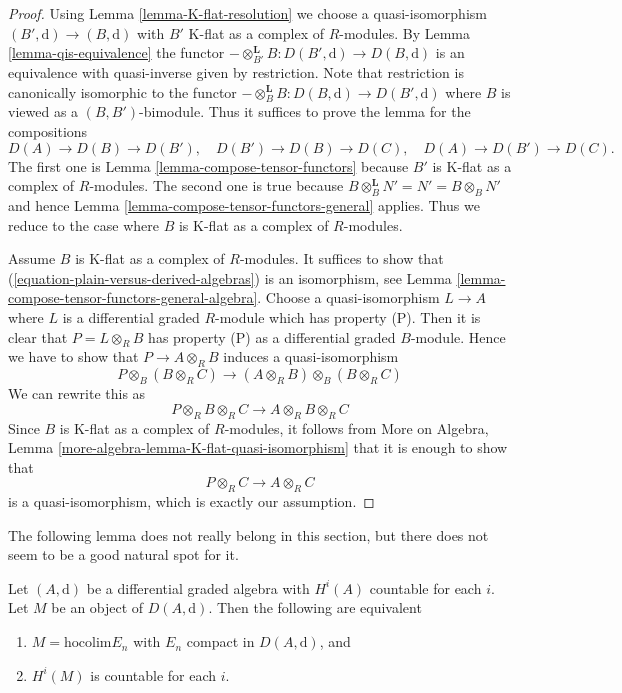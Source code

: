 \begin{proof}
Using Lemma \ref{lemma-K-flat-resolution}
we choose a quasi-isomorphism $(B', \text{d}) \to (B, \text{d})$
with $B'$ K-flat as a complex of $R$-modules.
By Lemma \ref{lemma-qis-equivalence}
the functor $-\otimes^\mathbf{L}_{B'} B : D(B', \text{d}) \to D(B, \text{d})$
is an equivalence with quasi-inverse given by restriction.
Note that restriction is canonically isomorphic to the functor
$- \otimes^\mathbf{L}_B B : D(B, \text{d}) \to D(B', \text{d})$
where $B$ is viewed as a $(B, B')$-bimodule.
Thus it suffices to prove the lemma for the compositions
$$
D(A) \to D(B) \to D(B'),\quad
D(B') \to D(B) \to D(C),\quad
D(A) \to D(B') \to D(C).
$$
The first one is Lemma \ref{lemma-compose-tensor-functors}
because $B'$ is K-flat as a complex of $R$-modules.
The second one is true because
$B \otimes_B^\mathbf{L} N' = N' = B \otimes_B N'$
and hence Lemma \ref{lemma-compose-tensor-functors-general} applies.
Thus we reduce to the case where $B$ is K-flat as a complex
of $R$-modules.

\medskip\noindent
Assume $B$ is K-flat as a complex of $R$-modules. It suffices to
show that (\ref{equation-plain-versus-derived-algebras}) is an
isomorphism, see
Lemma \ref{lemma-compose-tensor-functors-general-algebra}.
Choose a quasi-isomorphism $L \to A$ where $L$ is a differential
graded $R$-module which has property (P). Then it is clear that
$P = L \otimes_R B$ has property (P) as a differential graded $B$-module.
Hence we have to show that $P \to A \otimes_R B$
induces a quasi-isomorphism
$$
P \otimes_B (B \otimes_R C)
\longrightarrow
(A \otimes_R B) \otimes_B (B \otimes_R C)
$$
We can rewrite this as
$$
P \otimes_R B \otimes_R C \longrightarrow A \otimes_R B \otimes_R C
$$
Since $B$ is K-flat as a complex of $R$-modules, it
follows from
More on Algebra, Lemma \ref{more-algebra-lemma-K-flat-quasi-isomorphism}
that it is enough
to show that
$$
P \otimes_R C \to A \otimes_R C
$$
is a quasi-isomorphism, which is exactly our assumption.
\end{proof}

\noindent
The following lemma does not really belong in this section, but there
does not seem to be a good natural spot for it.

\begin{lemma}
\label{lemma-countable}
Let $(A, \text{d})$ be a differential graded algebra with
$H^i(A)$ countable for each $i$. Let $M$ be an object of $D(A, \text{d})$.
Then the following are equivalent
\begin{enumerate}
\item $M = \text{hocolim} E_n$ with $E_n$ compact in $D(A, \text{d})$, and
\item $H^i(M)$ is countable for each $i$.
\end{enumerate}
\end{lemma}

